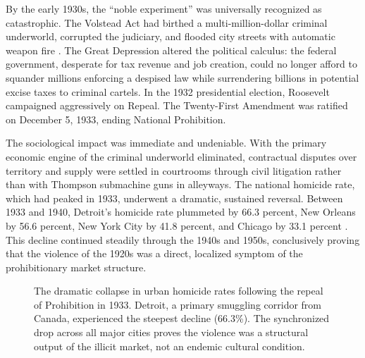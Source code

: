 \documentclass[12pt,openany]{book}
\begin{document}
By the early 1930s, the ``noble experiment'' was universally recognized as catastrophic. The Volstead Act had birthed a multi-million-dollar criminal underworld, corrupted the judiciary, and flooded city streets with automatic weapon fire \cite{mobmuseum_repeal}. The Great Depression altered the political calculus: the federal government, desperate for tax revenue and job creation, could no longer afford to squander millions enforcing a despised law while surrendering billions in potential excise taxes to criminal cartels. In the 1932 presidential election, Roosevelt campaigned aggressively on Repeal. The Twenty-First Amendment was ratified on December 5, 1933, ending National Prohibition.

The sociological impact was immediate and undeniable. With the primary economic engine of the criminal underworld eliminated, contractual disputes over territory and supply were settled in courtrooms through civil litigation rather than with Thompson submachine guns in alleyways. The national homicide rate, which had peaked in 1933, underwent a dramatic, sustained reversal. Between 1933 and 1940, Detroit's homicide rate plummeted by 66.3 percent, New Orleans by 56.6 percent, New York City by 41.8 percent, and Chicago by 33.1 percent \cite{hoplofobia_prohibition, newdeal_crime}. This decline continued steadily through the 1940s and 1950s, conclusively proving that the violence of the 1920s was a direct, localized symptom of the prohibitionary market structure.

\begin{figure}[htbp]
\centering
{}
\caption{The dramatic collapse in urban homicide rates following the repeal of Prohibition in 1933. Detroit, a primary smuggling corridor from Canada, experienced the steepest decline (66.3\%). The synchronized drop across all major cities proves the violence was a structural output of the illicit market, not an endemic cultural condition.}
\label{fig:post-repeal-decline}
\end{figure}
\end{document}
